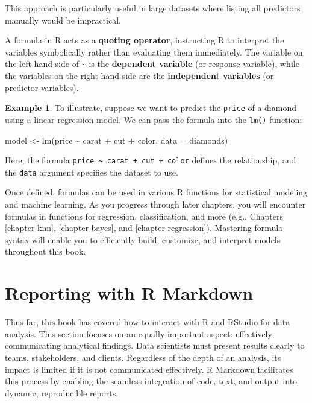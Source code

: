\documentclass[
  11pt,
]{book}
\makeatletter
\newenvironment{Shaded}{}{}
\newcommand{\AttributeTok}[1]{#1}
\newcommand{\FunctionTok}[1]{#1}
\newcommand{\NormalTok}[1]{#1}
\newcommand{\OtherTok}[1]{\textcolor[rgb]{0.39,0.39,0.39}{#1}}
\newcommand{\SpecialCharTok}[1]{\textcolor[rgb]{0.39,0.39,0.39}{#1}}
\newenvironment{kframe}{%
\medskip{}
\setlength{\fboxsep}{.8em}
 \def\at@end@of@kframe{}%
 \ifinner\ifhmode%
  \def\at@end@of@kframe{\end{minipage}}%
  \begin{minipage}{\columnwidth}%
 \fi\fi%
 \def\FrameCommand##1{\hskip\@totalleftmargin \hskip-\fboxsep
 \colorbox{shadecolor}{##1}\hskip-\fboxsep
     \hskip-\linewidth \hskip-\@totalleftmargin \hskip\columnwidth}%
 \MakeFramed {\advance\hsize-\width
   \@totalleftmargin\z@ \linewidth\hsize
   \@setminipage}}%
 {\par\unskip\endMakeFramed%
 \at@end@of@kframe}
\renewenvironment{Shaded}{\begin{kframe}}{\end{kframe}}
\theoremstyle{definition}
\theoremstyle{definition}
\newtheorem{example}{Example}[chapter]
\theoremstyle{definition}
\theoremstyle{definition}
\theoremstyle{remark}
\makeatother
\begin{document}
This approach is particularly useful in large datasets where listing all predictors manually would be impractical.

A formula in R acts as a \textbf{quoting operator}, instructing R to interpret the variables symbolically rather than evaluating them immediately. The variable on the left-hand side of \texttt{\textasciitilde{}} is the \textbf{dependent variable} (or response variable), while the variables on the right-hand side are the \textbf{independent variables} (or predictor variables).

\begin{example}
\protect\hypertarget{exm:ex-formula}{}\label{exm:ex-formula}To illustrate, suppose we want to predict the \texttt{price} of a diamond using a linear regression model. We can pass the formula into the \texttt{lm()} function:

\begin{Shaded}
\begin{Highlighting}[]
\NormalTok{model }\OtherTok{\textless{}{-}} \FunctionTok{lm}\NormalTok{(price }\SpecialCharTok{\textasciitilde{}}\NormalTok{ carat }\SpecialCharTok{+}\NormalTok{ cut }\SpecialCharTok{+}\NormalTok{ color, }\AttributeTok{data =}\NormalTok{ diamonds)}
\end{Highlighting}
\end{Shaded}

Here, the formula \texttt{price\ \textasciitilde{}\ carat\ +\ cut\ +\ color} defines the relationship, and the \texttt{data} argument specifies the dataset to use.
\end{example}

Once defined, formulas can be used in various R functions for statistical modeling and machine learning. As you progress through later chapters, you will encounter formulas in functions for regression, classification, and more (e.g., Chapters \ref{chapter-knn}, \ref{chapter-bayes}, and \ref{chapter-regression}). Mastering formula syntax will enable you to efficiently build, customize, and interpret models throughout this book.

\section{Reporting with R Markdown}\label{reporting-with-r-markdown}

Thus far, this book has covered how to interact with R and RStudio for data analysis. This section focuses on an equally important aspect: effectively communicating analytical findings. Data scientists must present results clearly to teams, stakeholders, and clients. Regardless of the depth of an analysis, its impact is limited if it is not communicated effectively. R Markdown facilitates this process by enabling the seamless integration of code, text, and output into dynamic, reproducible reports.
\end{document}
